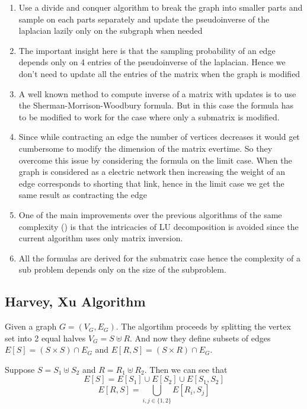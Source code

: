\begin{enumerate}
 \item Use a divide and conquer algorithm to break the graph into smaller parts and sample on each parts separately and update the pseudoinverse of the laplacian lazily only on the subgraph when needed
 \item The important insight here is that the sampling probability of an edge depends only on 4 entries of the pseudoinverse of the laplacian. Hence we don't need to update all the entries of the matrix when the graph is modified
 \item A well known method to compute inverse of a matrix with updates is to use the Sherman-Morrison-Woodbury formula. But in this case the formula has to be modified to work for the case where only a submatrix is modified.
 \item Since while contracting an edge the number of vertices decreases it would get cumbersome to modify the dimension of the matrix evertime. So they overcome this issue by considering the formula on the limit case. When the graph is considered as a electric network then increasing the weight of an edge corresponds to shorting that link, hence in the limit case we get the same result as contracting the edge
\item One of the main improvements over the previous algorithms of the same complexity (\citet{COLBOURN1996268}) is that the intricacies of LU decomposition is avoided since the current algorithm uses only matrix inversion.
\item All the formulas are derived for the submatrix case hence the complexity of a sub problem depends only on the size of the subproblem.
\end{enumerate}



\subsection{Harvey, Xu Algorithm}

Given a graph $G = (V_G, E_G)$. The algortihm proceeds by splitting the vertex set into 2 equal halves $V_G = S \uplus R$. And now they define subsets of edges $E[S] = (S \times S) \cap E_G$ and $E[R, S] = (S \times R) \cap E_G$. 

Suppose $S = S_1 \uplus S_2$ and $R = R_1 \uplus R_2$. Then we can see that 
$$ E[S] = E[S_1] \cup E[S_2] \cup E[S_1, S_2] $$ 
$$ E[R, S] = \bigcup\limits_{i,j \in \{1,2\} } E[R_i, S_j] $$

